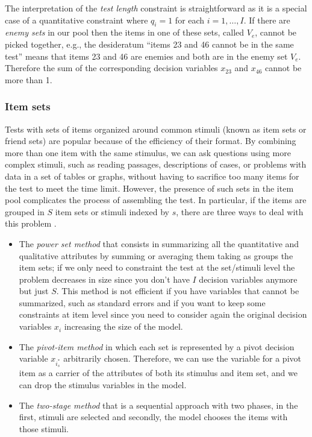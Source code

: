 The interpretation of the \textit{test length} constraint is straightforward as it is a special case of a quantitative constraint where $q_i=1$ for each $i=1,\ldots,I$.
If there are \textit{enemy sets} in our pool then the items in one of these sets, called $V_e$, cannot be picked together, e.g., the desideratum ``items 23 and 46 cannot be in the same test'' means that items 23 and 46 are enemies and both are in the enemy set $V_e$. Therefore the sum of the corresponding decision variables $x_{23}$ and $x_{46}$ cannot be more than 1.

\subsubsection{Item sets}\label{sec:item-sets}
Tests with sets of items organized around common stimuli (known as item sets or friend sets) are popular because of the efficiency of their format. By combining more than one item with the same stimulus, we can ask questions using more complex stimuli, such as reading passages, descriptions of cases, or problems with data in a set of tables or graphs, without having to sacrifice too many items for the test to meet the time limit. However, the presence of such sets in the item pool complicates the process of assembling the test. In particular, if the items are grouped in $S$ item sets or stimuli indexed by $s$, there are three ways to deal with this problem \parencite[see][]{VDL2005}.

\begin{itemize}
	\item The \textit{power set method} that consists in summarizing all the quantitative and qualitative attributes by summing or averaging them taking as groups the item sets; if we only need to constraint the test at the set/stimuli level the problem decreases in size since you don't have $I$ decision variables anymore but just $S$. This method is not efficient if you have variables that cannot be summarized, such as standard errors and if you want to keep some constraints at item level since you need to consider again the original decision variables $x_i$ increasing the size of the model.
	\item The \textit{pivot-item method} in which each set is represented by a pivot decision variable $x_{i^*_s}$ arbitrarily chosen. Therefore, we can use the variable for a pivot item as a carrier of the attributes of both its stimulus and item set, and we can drop the stimulus variables in the model.
	\item The \textit{two-stage method} that is a sequential approach with two phases, in the first, stimuli are selected and secondly, the model chooses the items with those stimuli.
	
\end{itemize}

